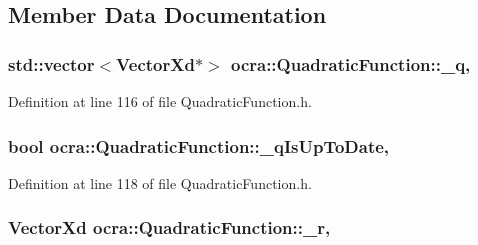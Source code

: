 \subsection{Member Data Documentation}
\subsubsection[{\texorpdfstring{\+\_\+q}{_q}}]{\setlength{\rightskip}{0pt plus 5cm}std\+::vector$<$Vector\+Xd$\ast$$>$ ocra\+::\+Quadratic\+Function\+::\+\_\+q\hspace{0.3cm}{\ttfamily [mutable]}, {\ttfamily [protected]}}\hypertarget{classocra_1_1QuadraticFunction_a0019bf700f128841e50dbceaa4c75dd2}{}\label{classocra_1_1QuadraticFunction_a0019bf700f128841e50dbceaa4c75dd2}


Definition at line 116 of file Quadratic\+Function.\+h.

\subsubsection[{\texorpdfstring{\+\_\+q\+Is\+Up\+To\+Date}{_qIsUpToDate}}]{\setlength{\rightskip}{0pt plus 5cm}bool ocra\+::\+Quadratic\+Function\+::\+\_\+q\+Is\+Up\+To\+Date\hspace{0.3cm}{\ttfamily [mutable]}, {\ttfamily [protected]}}\hypertarget{classocra_1_1QuadraticFunction_adc8b30315f5cef54f2318c93844a6a66}{}\label{classocra_1_1QuadraticFunction_adc8b30315f5cef54f2318c93844a6a66}


Definition at line 118 of file Quadratic\+Function.\+h.

\subsubsection[{\texorpdfstring{\+\_\+r}{_r}}]{\setlength{\rightskip}{0pt plus 5cm}Vector\+Xd ocra\+::\+Quadratic\+Function\+::\+\_\+r\hspace{0.3cm}{\ttfamily [mutable]}, {\ttfamily [protected]}}\hypertarget{classocra_1_1QuadraticFunction_a56771e89a23a61fcc15cfd4d10c6956c}{}\label{classocra_1_1QuadraticFunction_a56771e89a23a61fcc15cfd4d10c6956c}


